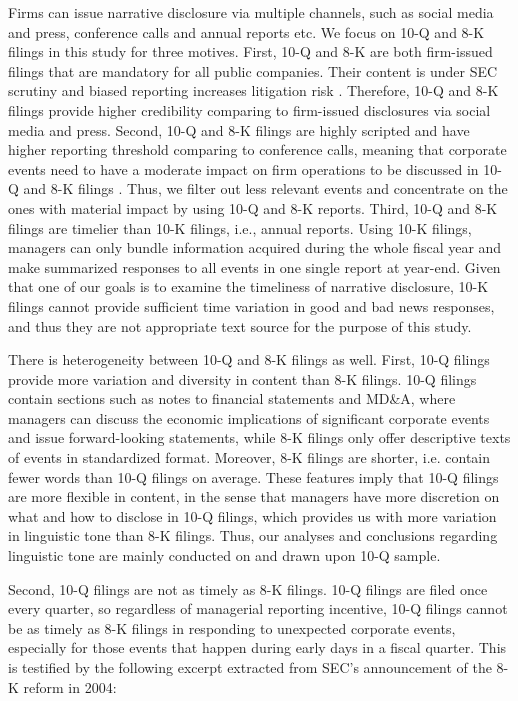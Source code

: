 \documentclass[a4paper]{article}
\begin{document}
\begin{spacing}{2}
Firms can issue narrative disclosure via multiple channels, such as social media and press, conference calls and annual reports etc. We focus on 10-Q and 8-K filings in this study for three motives. First, 10-Q and 8-K are both firm-issued filings that are mandatory for all public companies. Their content is under SEC scrutiny and biased reporting increases litigation risk . Therefore, 10-Q and 8-K filings provide higher credibility comparing to firm-issued disclosures via social media and press. Second, 10-Q and 8-K filings are highly scripted and have higher reporting threshold comparing to conference calls, meaning that corporate events need to have a moderate impact on firm operations to be discussed in 10-Q and 8-K filings . Thus, we filter out less relevant events and concentrate on the ones with material impact by using 10-Q and 8-K reports. Third, 10-Q and 8-K filings are timelier than 10-K filings, i.e., annual reports. Using 10-K filings, managers can only bundle information acquired during the whole fiscal year and make summarized responses to all events in one single report at year-end. Given that one of our goals is to examine the timeliness of narrative disclosure, 10-K filings cannot provide sufficient time variation in good and bad news responses, and thus they are not appropriate text source for the purpose of this study.

There is heterogeneity between 10-Q and 8-K filings as well. First, 10-Q filings provide more variation and diversity in content than 8-K filings. 10-Q filings contain sections such as notes to financial statements and MD\&A, where managers can discuss the economic implications of significant corporate events and issue forward-looking statements, while 8-K filings only offer descriptive texts of events in standardized format. Moreover, 8-K filings are shorter, i.e. contain fewer words than 10-Q filings on average. These features imply that 10-Q filings are more flexible in content, in the sense that managers have more discretion on what and how to disclose in 10-Q filings, which provides us with more variation in linguistic tone than 8-K filings. Thus, our analyses and conclusions regarding linguistic tone are mainly conducted on and drawn upon 10-Q sample. 

Second, 10-Q filings are not as timely as 8-K filings. 10-Q filings are filed once every quarter, so regardless of managerial reporting incentive, 10-Q filings cannot be as timely as 8-K filings in responding to unexpected corporate events, especially for those events that happen during early days in a fiscal quarter. This is testified by the following excerpt extracted from SEC's announcement of the 8-K reform in 2004:


\end{spacing}
\end{document}
